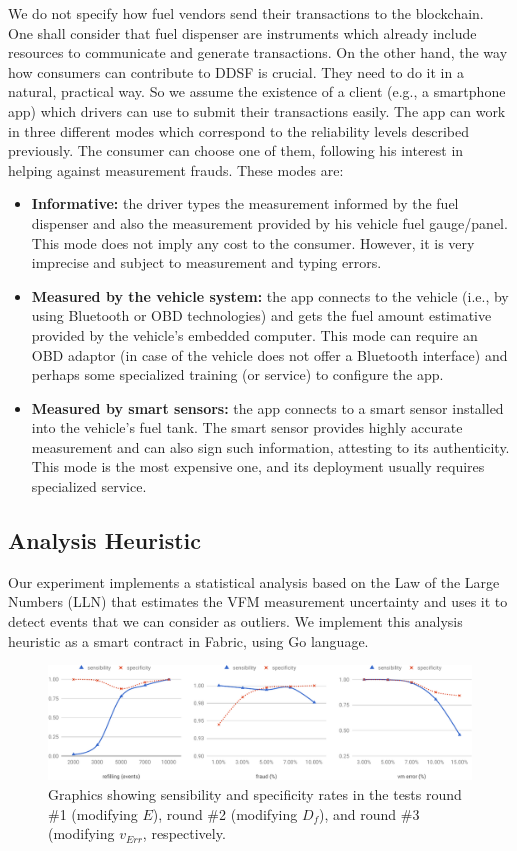 \documentclass[sigplan]{acmart}
\begin{document}
We do not specify how fuel vendors send their transactions to the blockchain.
One shall consider that fuel dispenser are instruments which already include resources to communicate and generate transactions.
On the other hand, the way how consumers can contribute to DDSF is crucial.
They need to do it in a natural, practical way.
So we assume the existence of a client (e.g., a smartphone app) which drivers can use to submit their transactions easily.
The app can work in three different modes which correspond to the reliability levels described previously.
The consumer can choose one of them, following his interest in helping against measurement frauds.
These modes are:
\begin{itemize}
 \item \textbf{Informative:} the driver types the measurement informed by the fuel dispenser and also the measurement provided by his vehicle fuel gauge/panel. This mode does not imply any cost to the consumer. However, it is very imprecise and subject to measurement and typing errors.
 \item \textbf{Measured by the vehicle system:} the app connects to the vehicle (i.e., by using Bluetooth or OBD technologies) and gets the fuel amount estimative provided by the vehicle's embedded computer. This mode can require an OBD adaptor (in case of the vehicle does not offer a Bluetooth interface) and perhaps some specialized training (or service) to configure the app.
 \item \textbf{Measured by smart sensors:} the app connects to a smart sensor installed into the vehicle's fuel tank. The smart sensor provides highly accurate measurement and can also sign such information, attesting to its authenticity. This mode is the most expensive one, and its deployment usually requires specialized service.
\end{itemize}

\subsection{Analysis Heuristic}
Our experiment implements a statistical analysis based on the Law of the Large Numbers (LLN) that estimates the VFM measurement uncertainty and uses it to detect events that we can consider as outliers.
We implement this analysis heuristic as a smart contract in Fabric, using Go language.

\begin{figure}[!t]
\centering
\includegraphics[width=.9\textwidth]{lln}
\caption{Graphics showing sensibility and specificity rates in the tests round \#1 (modifying $E$), round \#2 (modifying $D_f$), and round \#3 (modifying $v_{Err}$, respectively.}
\label{f:lln}
\end{figure}
\end{document}
